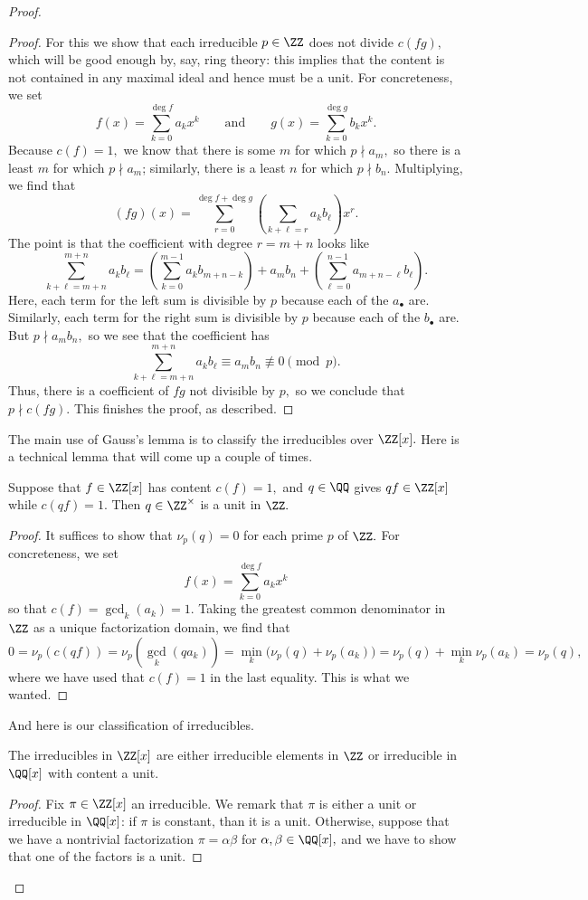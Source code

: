 \documentclass[../notes.tex]{subfiles}
\begin{document}
\begin{proof}
\begin{proof}
		For this we show that each irreducible $p\in\ZZ$ does not divide $c(fg),$ which will be good enough by, say, ring theory: this implies that the content is not contained in any maximal ideal and hence must be a unit. For concreteness, we set
		\[f(x)=\sum_{k=0}^{\deg f}a_kx^k\qquad\text{and}\qquad g(x)=\sum_{k=0}^{\deg g}b_kx^k.\]
		Because $c(f)=1,$ we know that there is some $m$ for which $p\nmid a_m,$ so there is a least $m$ for which $p\nmid a_m$; similarly, there is a least $n$ for which $p\nmid b_n.$ Multiplying, we find that
		\[(fg)(x)=\sum_{r=0}^{\deg f+\deg g}\left(\sum_{k+\ell=r}a_kb_\ell\right)x^r.\]
		The point is that the coefficient with degree $r=m+n$ looks like
		\[\sum_{k+\ell=m+n}^{m+n}a_kb_\ell=\left(\sum_{k=0}^{m-1}a_kb_{m+n-k}\right)+a_mb_n+\left(\sum_{\ell=0}^{n-1}a_{m+n-\ell}b_\ell\right).\]
		Here, each term for the left sum is divisible by $p$ because each of the $a_\bullet$ are. Similarly, each term for the right sum is divisible by $p$ because each of the $b_\bullet$ are. But $p\nmid a_mb_n,$ so we see that the coefficient has
		\[\sum_{k+\ell=m+n}^{m+n}a_kb_\ell\equiv a_mb_n\not\equiv0\pmod p.\]
		Thus, there is a coefficient of $fg$ not divisible by $p,$ so we conclude that $p\nmid c(fg).$ This finishes the proof, as described.
	\end{proof}

	The main use of Gauss's lemma is to classify the irreducibles over $\ZZ[x].$ Here is a technical lemma that will come up a couple of times.
	\begin{lemma} \label{lem:technicalgauss}
		Suppose that $f\in\ZZ[x]$ has content $c(f)=1,$ and $q\in\QQ$ gives $qf\in\ZZ[x]$ while $c(qf)=1.$ Then $q\in\ZZ^\times$ is a unit in $\ZZ.$
	\end{lemma}
	\begin{proof}
		It suffices to show that $\nu_p(q)=0$ for each prime $p$ of $\ZZ.$ For concreteness, we set
		\[f(x)=\sum_{k=0}^{\deg f}a_kx^k\]
		so that $c(f)=\gcd_k(a_k)=1.$
		Taking the greatest common denominator in $\ZZ$ as a unique factorization domain, we find that
		\[0=\nu_p(c(qf))=\nu_p(\gcd_k(qa_k))=\min_k\big(\nu_p(q)+\nu_p(a_k)\big)=\nu_p(q)+\min_k\nu_p(a_k)=\nu_p(q),\]
		where we have used that $c(f)=1$ in the last equality. This is what we wanted.
	\end{proof}
	And here is our classification of irreducibles.
	\begin{lemma}
		The irreducibles in $\ZZ[x]$ are either irreducible elements in $\ZZ$ or irreducible in $\QQ[x]$ with content a unit.
	\end{lemma}
	\begin{proof}
		Fix $\pi\in\ZZ[x]$ an irreducible. We remark that $\pi$ is either a unit or irreducible in $\QQ[x]$: if $\pi$ is constant, than it is a unit. Otherwise, suppose that we have a nontrivial factorization $\pi=\alpha\beta$ for $\alpha,\beta\in\QQ[x],$ and we have to show that one of the factors is a unit.
		

\end{proof}
\end{proof}
\end{document}
